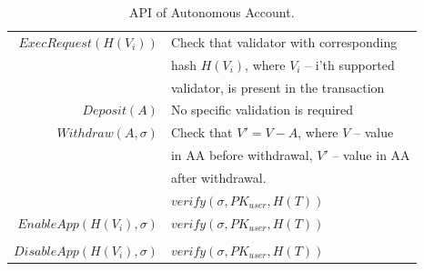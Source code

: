 \documentclass[11pt]{article}
\begin{document}
\begin{sloppypar}
        \begin{table}[h!]
            \begin{center}
                \begin{tabular}{ | r l | }
                    \hline
                    $ExecRequest(H(V_i))$        & Check that validator with corresponding      \\
                    \space                       & hash $H(V_i)$, where $V_i$ -- i'th supported \\
                    \space                       & validator, is present in the transaction     \\
                    $Deposit(A)$                 & No specific validation is required           \\
                    $Withdraw(A, \sigma)$        & Check that $V' = V - A$, where $V$ -- value  \\
                    \space                       & in AA before withdrawal, $V'$ -- value in AA \\
                    \space                       & after withdrawal.                            \\
                    \space                       & $verify(\sigma, PK_{user}, H(T))$            \\
                    $EnableApp(H(V_i), \sigma)$  & $verify(\sigma, PK_{user}, H(T))$            \\
                    \space                       &                                              \\
                    $DisableApp(H(V_i), \sigma)$ & $verify(\sigma, PK_{user}, H(T))$            \\
                    \hline
                \end{tabular}
            \end{center}
            \caption{API of Autonomous Account.}
            \label{tab:table4}
        \end{table}

        \newpage
        
        

    \end{sloppypar}
\end{document}

